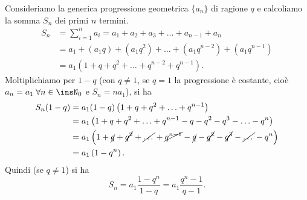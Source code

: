 Consideriamo la generica progressione geometrica $\{a_n\}$ di ragione $q$ e calcoliamo la somma $S_n$ dei primi $n$ termini.
\begin{align*}
S_n&=\sum_{i=1}^{n}a_i=a_1+a_2+a_3+\ldots+a_{n-1}+a_n\\
&=a_1+\left(a_1q\right)+\left(a_1q^2\right)+\ldots+\left(a_1q^{n-2}\right)+\left(a_1q^{n-1}\right)\\
&=a_1\left(1+q+q^2+\ldots+q^{n-2}+q^{n-1}\right).
\end{align*}
Moltiplichiamo per $1-q$ (con $q \ne 1$, se $q=1$ la progressione è costante, cioè $a_n=a_1\;\forall n\in\insN_0$ e $S_n = na_1$), si ha
\begin{align*}
S_n(1-q)&=a_1(1-q)\left(1+q+q^2+\ldots+q^{n-1}\right)\\
&=a_1\left(1+q+q^2+\ldots+q^{n-1}-q-q^2-q^3-\ldots-q^n\right)\\
&=a_1\left(1+\cancel{q}+\cancel{q^2}+\cancel{\ldots\vphantom{q^n}}+\cancel{q^{n-1}}-\cancel{q}-\cancel{q^2}-\cancel{q^3}-\cancel{\ldots\vphantom{q^n}}-q^n\right)\\
&=a_1\left(1-q^n\right).
\end{align*}
Quindi (se $q\ne 1$) si ha
\[S_n=a_1\frac{1-q^n}{1-q}=a_1\frac{q^n-1}{q-1}.\]

\ovalbox{\risolvii \ref{ese:8a_progr.22}, \ref{ese:8a_progr.23}, \ref{ese:8a_progr.24}, \ref{ese:8a_progr.25}, \ref{ese:8a_progr.26}, \ref{ese:8a_progr.27}, \ref{ese:8a_progr.28}, \ref{ese:8a_progr.29}, \ref{ese:8a_progr.30}, \ref{ese:8a_progr.31}, \ref{ese:8a_progr.32},}

\ovalbox{\ref{ese:8a_progr.33}}

\newpage



\cleardoublepage